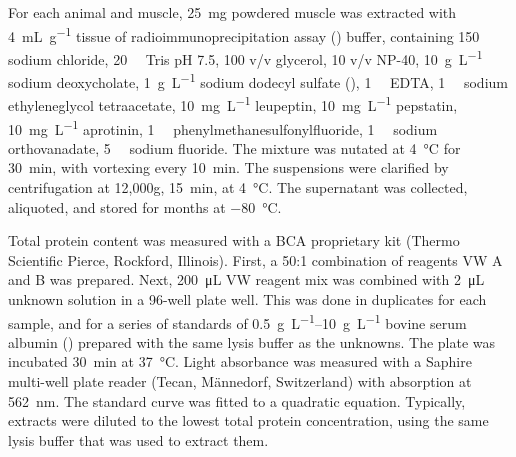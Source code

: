 \documentclass[12pt,english]{report}\usepackage[]{graphicx}\usepackage[]{color}
\begin{document}
For each animal and muscle, \SI{25}{\milli\gram} powdered muscle
was extracted with \SI{4}{\milli\liter\per\gram} tissue of radioimmunoprecipitation
assay () buffer,
containing \SI{150}{\milli\molar} sodium chloride, \SI{20}{\milli\molar}
Tris pH 7.5, \SI{100}{\promille} v/v glycerol, \SI{10}{\promille} 
v/v NP-40, \SI{10}{\gram\per\liter} sodium deoxycholate, \SI{1}{\gram\per\liter}
sodium dodecyl sulfate (),
\SI{1}{\milli\molar} EDTA, \SI{1}{\milli\molar} sodium ethyleneglycol
tetraacetate, \SI{10}{\milli\gram\per\liter} leupeptin, \SI{10}{\milli\gram\per\liter}
pepstatin, \SI{10}{\milli\gram\per\liter} aprotinin, \SI{1}{\milli\molar}
phenylmethanesulfonylfluoride, \SI{1}{\milli\molar} sodium orthovanadate,
\SI{5}{\milli\molar} sodium fluoride. The mixture was nutated at
\SI{4}{\celsius} for \SI{30}{\minute}, with vortexing every \SI{10}{\minute}.
The suspensions were clarified by centrifugation at 12,000g, \SI{15}{\minute},
at \SI{4}{\celsius}. The supernatant was collected, aliquoted, and
stored for months at \SI{-80}{\celsius}.

Total protein content was measured with a BCA proprietary kit (Thermo
Scientific Pierce, Rockford, Illinois). First, a 50:1 combination
of reagents VW A and B was prepared. Next, \SI{200}{\micro\liter}
VW reagent mix was combined with \SI{2}{\micro\liter} unknown solution
in a 96-well plate well. This was done in duplicates for each sample,
and for a series of standards of \SIrange{.5}{10}{\gram\per\liter}
bovine serum albumin () prepared
with the same lysis buffer as the unknowns. The plate was incubated
\SI{30}{\minute} at \SI{37}{\celsius}. Light absorbance was measured
with a Saphire multi-well plate reader (Tecan, Männedorf, Switzerland)
with absorption at \SI{562}{\nano\meter}. The standard curve was
fitted to a quadratic equation. Typically, extracts were diluted to
the lowest total protein concentration, using the same lysis buffer
that was used to extract them.
\end{document}
